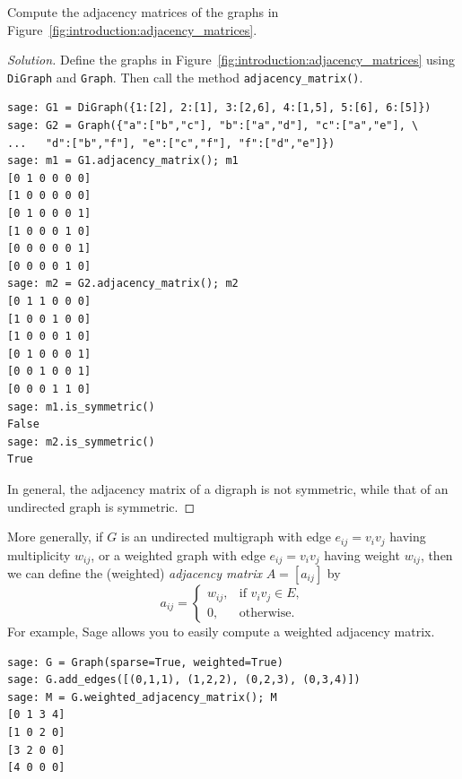 \begin{example}
Compute the adjacency matrices of the graphs in
Figure~\ref{fig:introduction:adjacency_matrices}.
\end{example}

\begin{proof}[Solution]
Define the graphs in Figure~\ref{fig:introduction:adjacency_matrices}
using \verb!DiGraph! and \verb!Graph!. Then call the method
\verb!adjacency_matrix()!.
\begin{lstlisting}
sage: G1 = DiGraph({1:[2], 2:[1], 3:[2,6], 4:[1,5], 5:[6], 6:[5]})
sage: G2 = Graph({"a":["b","c"], "b":["a","d"], "c":["a","e"], \
...   "d":["b","f"], "e":["c","f"], "f":["d","e"]})
sage: m1 = G1.adjacency_matrix(); m1
[0 1 0 0 0 0]
[1 0 0 0 0 0]
[0 1 0 0 0 1]
[1 0 0 0 1 0]
[0 0 0 0 0 1]
[0 0 0 0 1 0]
sage: m2 = G2.adjacency_matrix(); m2
[0 1 1 0 0 0]
[1 0 0 1 0 0]
[1 0 0 0 1 0]
[0 1 0 0 0 1]
[0 0 1 0 0 1]
[0 0 0 1 1 0]
sage: m1.is_symmetric()
False
sage: m2.is_symmetric()
True
\end{lstlisting}
In general, the adjacency matrix of a digraph is not symmetric, while
that of an undirected graph is symmetric.
\end{proof}


More generally, if $G$ is an undirected multigraph with edge
$e_{ij} = v_i v_j$ having multiplicity $w_{ij}$, or a weighted
graph with edge $e_{ij} = v_i v_j$ having weight $w_{ij}$, then we
can define the (weighted) \emph{adjacency matrix} $A = [a_{ij}]$ by
\[
a_{ij}
=
\begin{cases}
w_{ij}, & \text{if $v_i v_j \in E$}, \\
0,      & \text{otherwise}.
\end{cases}
\]
For example, Sage allows you to easily compute a weighted adjacency
matrix.
\begin{lstlisting}
sage: G = Graph(sparse=True, weighted=True)
sage: G.add_edges([(0,1,1), (1,2,2), (0,2,3), (0,3,4)])
sage: M = G.weighted_adjacency_matrix(); M
[0 1 3 4]
[1 0 2 0]
[3 2 0 0]
[4 0 0 0]
\end{lstlisting}



